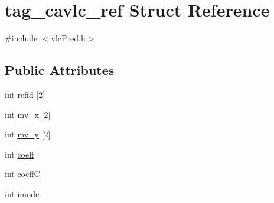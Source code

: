 \hypertarget{structtag__cavlc__ref}{
\section{tag\_\-cavlc\_\-ref Struct Reference}
\label{structtag__cavlc__ref}
}


{\ttfamily \#include $<$vlcPred.h$>$}

\subsection*{Public Attributes}
\begin{DoxyCompactItemize}
\item 
int \hyperlink{structtag__cavlc__ref_a071bb830fe08f1df5618d391ed428221}{refid} \mbox{[}2\mbox{]}
\item 
int \hyperlink{structtag__cavlc__ref_a890a9186d3db3787c7a451e51f4fc0bf}{mv\_\-x} \mbox{[}2\mbox{]}
\item 
int \hyperlink{structtag__cavlc__ref_abae0c90668fedb380b2cc0773cfa351d}{mv\_\-y} \mbox{[}2\mbox{]}
\item 
int \hyperlink{structtag__cavlc__ref_a4fc396cd8d03fbd50466ff12a4785529}{coeff}
\item 
int \hyperlink{structtag__cavlc__ref_a38397a4aa7f4f450d2bed25146783b22}{coeffC}
\item 
int \hyperlink{structtag__cavlc__ref_a76c8b0c75a3a13a59196c89cf919766f}{imode}
\end{DoxyCompactItemize}


